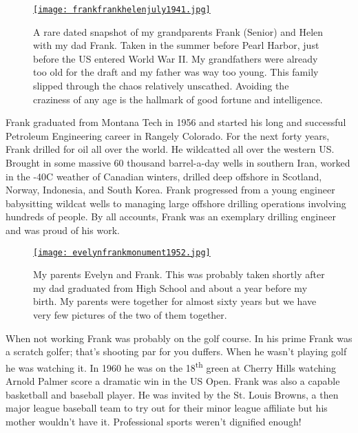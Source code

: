 \begin{SCfigure}[50]
\centering
\href{https://conceptcontrol.smugmug.com/People/The-Way-We-Were/i-SXfn4nQ/A}{\texttt{[image: frankfrankhelenjuly1941.jpg]}}
\caption{A rare dated snapshot of my grandparents Frank (Senior) and
Helen with my dad Frank. Taken in the summer before Pearl Harbor, just
before the US entered World War II. My grandfathers were already too old
for the draft and my father was way too young. This family slipped
through the chaos relatively unscathed. Avoiding the craziness of any
age is the hallmark of good fortune and intelligence.}
\label{fig:7074x1}
\end{SCfigure}

Frank graduated from Montana Tech in 1956 and started his long and
successful Petroleum Engineering career in Rangely Colorado. For the
next forty years, Frank drilled for oil all over the world. He
wildcatted all over the western US. Brought in some massive 60 thousand
barrel-a-day wells in southern Iran, worked in the -40C weather of
Canadian winters, drilled deep offshore in Scotland, Norway, Indonesia,
and South Korea. Frank progressed from a young engineer babysitting
wildcat wells to managing large offshore drilling operations involving
hundreds of people. By all accounts, Frank was an exemplary drilling
engineer and was proud of his work.

\begin{SCfigure}[50]
\centering
\href{https://conceptcontrol.smugmug.com/People/The-Way-We-Were/i-Z5FBnXx/A}{\texttt{[image: evelynfrankmonument1952.jpg]}}
\caption{My parents Evelyn and Frank. This was probably taken shortly
after my dad graduated from High School and about a year before my
birth. My parents were together for almost sixty years but we have very
few pictures of the two of them together.}
\label{fig:7074x2}
\end{SCfigure}

When not working Frank was probably on the golf course. In his prime
Frank was a scratch golfer; that's shooting par for you duffers. When he
wasn't playing golf he was watching it. In 1960 he was on the
18\textsuperscript{th} green at Cherry Hills watching Arnold Palmer
score a dramatic win in the US Open. Frank was also a capable basketball
and baseball player. He was invited by the St. Louis Browns, a then
major league baseball team to try out for their minor league affiliate
but his mother wouldn't have it. Professional sports weren't dignified
enough!

